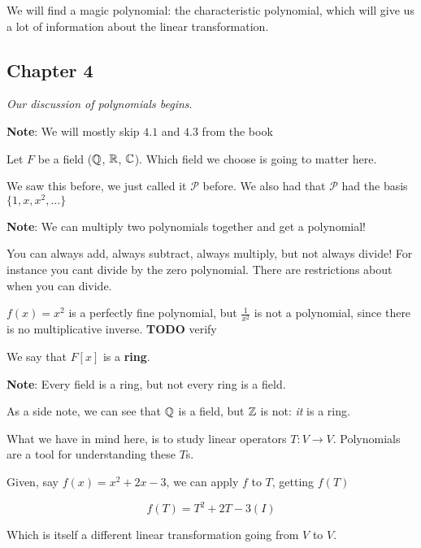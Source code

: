 \documentclass[12pt]{article}
\def\P{\mathcal P}
\newcommand{\TODO}{\color{red}\textbf{TODO}\color{black}}
\begin{document}
  We will find a magic polynomial: the characteristic polynomial, which will
  give us a lot of information about the linear transformation.

  \subsection{Chapter 4}

  {\it Our discussion of polynomials begins}.

  {\bf Note}: We will mostly skip $4.1$ and $4.3$ from the book

  Let $F$ be a field (${\mathbb Q}$, ${\mathbb R}$, ${\mathbb C}$). Which field we choose is going to
  matter here.


  We saw this before, we just called it $\P$ before. We also had that $\P$ had
  the basis $\{1, x, x^2, \dots\}$

  {\bf Note}: We can multiply two polynomials together and get a polynomial!

  You can always add, always subtract, always multiply, but not always divide!
  For instance you cant divide by the zero polynomial. There are restrictions
  about when you can divide.

  $f(x) = x^2$ is a perfectly fine polynomial, but $\frac{1}{x^2}$ is not a
  polynomial, since there is no multiplicative inverse. \TODO{} verify

  We say that $F[x]$ is a {\bf ring}.

  {\bf Note}: Every field is a ring, but not every ring is a field.

  As a side note, we can see that ${\mathbb Q}$ is a field, but ${\mathbb Z}$ is not: {\it it} is a ring.

  What we have in mind here, is to study linear operators $T: V \to V$.
  Polynomials are a tool for understanding these $T$s.

  Given, say $f(x) = x^2 + 2x - 3$, we can apply $f$ to $T$, getting $f(T)$

  \[
    f(T) = T^2 + 2T - 3(I)
  \]


  Which is itself a different linear transformation going from $V$ to $V$.
\end{document}
